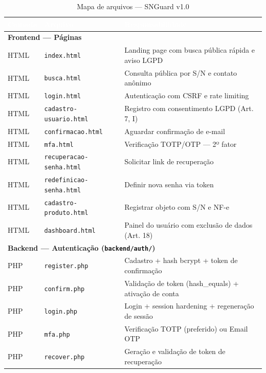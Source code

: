 \documentclass[12pt,a4paper]{article}
\begin{document}
\begin{table}[H]
  \centering
  \caption{Mapa de arquivos — SNGuard v1.0}
  \label{tab:arquivos}
  \small
  \renewcommand{\arraystretch}{1.3}
  \begin{tabularx}{\textwidth}{|l|l|X|}
    \hline
    \rowcolor{cinzaHeader}
    \textcolor{white}{\textbf{Camada}} &
    \textcolor{white}{\textbf{Arquivo}} &
    \textcolor{white}{\textbf{Responsabilidade}} \\
    \hline
    \multicolumn{3}{|l|}{\textbf{Frontend — Páginas}} \\
    \hline
    HTML & \texttt{index.html}              & Landing page com busca pública rápida e aviso LGPD \\
    HTML & \texttt{busca.html}              & Consulta pública por S/N e contato anônimo \\
    HTML & \texttt{login.html}              & Autenticação com CSRF e rate limiting \\
    HTML & \texttt{cadastro-usuario.html}   & Registro com consentimento LGPD (Art. 7, I) \\
    HTML & \texttt{confirmacao.html}        & Aguardar confirmação de e-mail \\
    HTML & \texttt{mfa.html}               & Verificação TOTP/OTP — 2º fator \\
    HTML & \texttt{recuperacao-senha.html}  & Solicitar link de recuperação \\
    HTML & \texttt{redefinicao-senha.html}  & Definir nova senha via token \\
    HTML & \texttt{cadastro-produto.html}   & Registrar objeto com S/N e NF-e \\
    HTML & \texttt{dashboard.html}          & Painel do usuário com exclusão de dados (Art. 18) \\
    \hline
    \multicolumn{3}{|l|}{\textbf{Backend — Autenticação (\texttt{backend/auth/})}} \\
    \hline
    PHP & \texttt{register.php}   & Cadastro + hash bcrypt + token de confirmação \\
    PHP & \texttt{confirm.php}    & Validação de token (hash\_equals) + ativação de conta \\
    PHP & \texttt{login.php}      & Login + session hardening + regeneração de sessão \\
    PHP & \texttt{mfa.php}        & Verificação TOTP (preferido) ou Email OTP \\
    PHP & \texttt{recover.php}    & Geração e validação de token de recuperação \\

\end{tabularx}
\end{table}
\end{document}
